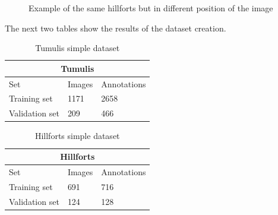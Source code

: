 \begin{figure}[H]
    \centering
    \qquad
    \caption{Example of the same hillforts but in different position of the image}%
\end{figure}

The next two tables show the results of the dataset creation.

\begin{table}[H]
\centering
\begin{tabular}{|p{3cm}|p{2.5cm}|p{2cm}|} 
\hline
\multicolumn{3}{|c|}{Tumulis} \\
 \hline
  Set & Images & Annotations\\ [0.5ex] 
 \hline
 Training set & 1171 & 2658 \\ 
 Validation set & 209 & 466  \\[1ex]
 \hline
\end{tabular}
\caption{Tumulis simple dataset}
\end{table} 

\begin{table}[H]
\centering
\begin{tabular}{|p{3cm}|p{2.5cm}|p{2cm}|} 
\hline
\multicolumn{3}{|c|}{Hillforts} \\
 \hline
  Set & Images & Annotations\\ [0.5ex] 
 \hline
 Training set & 691 & 716 \\ 
 Validation set & 124 & 128  \\[1ex]
 \hline
\end{tabular}
\caption{Hillforts simple dataset}
\end{table} 